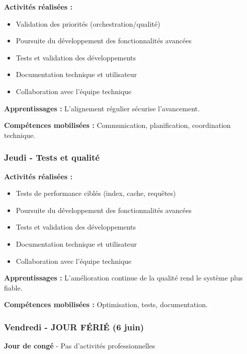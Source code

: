 \textbf{Activités réalisées :}
\begin{itemize}
    \item Validation des priorités (orchestration/qualité)
    \item Poursuite du développement des fonctionnalités avancées
    \item Tests et validation des développements
    \item Documentation technique et utilisateur
    \item Collaboration avec l'équipe technique
\end{itemize}

\textbf{Apprentissages :}
L'alignement régulier sécurise l'avancement.

\textbf{Compétences mobilisées :}
Communication, planification, coordination technique.

\subsubsection{Jeudi - Tests et qualité}

\textbf{Activités réalisées :}
\begin{itemize}
    \item Tests de performance ciblés (index, cache, requêtes)
    \item Poursuite du développement des fonctionnalités avancées
    \item Tests et validation des développements
    \item Documentation technique et utilisateur
    \item Collaboration avec l'équipe technique
\end{itemize}

\textbf{Apprentissages :}
L'amélioration continue de la qualité rend le système plus fiable.

\textbf{Compétences mobilisées :}
Optimisation, tests, documentation.

\subsubsection{Vendredi - JOUR FÉRIÉ (6 juin)}

\textbf{Jour de congé} - Pas d'activités professionnelles

